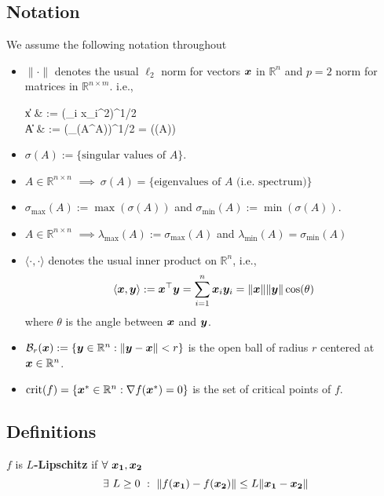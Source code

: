 \documentclass[10pt]{article}
\begin{document}
\subsection*{Notation}
    We assume the following notation throughout\
    \begin{itemize}
        \label{notation}
        \item $\| \cdot \|$ denotes the usual $\ell_2$ norm for vectors $\bm{x}$ in $\mathbb{R}^n$ and $p = 2$ norm
        for matrices in $\mathbb{R}^{n \times m}$. i.e.,
        \begin{flalign*}
            \|x\| & := \left(\sum_i x_i^2\right)^{1/2} \\
                \|A\| & := (\lambda_{\max}(A^\top A))^{1/2}
        = \max(\sigma(A))
        \end{flalign*}
        \item $\sigma(A) := \{\text{singular values of } A\}$.
        \item $A \in \mathbb{R}^{n\times n}$ $\implies ~ \sigma(A) = \{\text{eigenvalues of } A \text{ (i.e. spectrum)}\}$
        \item $\sigma_{\max}(A) := \max(\sigma(A))$ and $\sigma_{\min}(A) := \min(\sigma(A))$.
        \item $ A \in \mathbb{R}^{n\times n}$  $\implies \lambda_{\max}(A) := \sigma_{\max}(A)$ and $\lambda_{\min}(A) = \sigma_{\min}(A) $
        \item $\langle \cdot, \cdot \rangle$ denotes the usual inner product on $\mathbb{R}^n$, i.e.,
        $$
            \langle \bm{x}, \bm{y} \rangle := \bm{x}^\top \bm{y} = \sum_{i=1}^n \bm{x}_i \bm{y}_i = \| \bm{x} \| \|\bm{y}\| \cos(\theta)
        $$
        where $\theta$ is the angle between $\bm{x}$ and $\bm{y}$.
        \item $\mathcal{B}_r(\bm{x}) := \{ \bm{y} \in \mathbb{R}^n : \|\bm{y} - \bm{x}\| < r \}$ is the open ball of 
        radius $r$ centered at $\bm{x} \in \mathbb{R}^n$.
        \item $\text{crit}(f) = \{ \bm{x}^* \in \mathbb{R}^n : \nabla f(\bm{x}^*) = 0 \}$ is the set of critical points of $f$.
    \end{itemize}


\subsection{Definitions}
    \label{sec:definitions}
    
    \begin{definition}
        $f$ is \textbf{$L$-Lipschitz} if $\forall ~ \bm{x_1},\bm{x_2}$
        $$
        \; \exists~ L \geq 0 ~:~  \| f(\bm{x_1}) - f(\bm{x_2})\| 
        \leq L\|\bm{x_1} - \bm{x_2}\|
        $$
    \end{definition}
\end{document}
